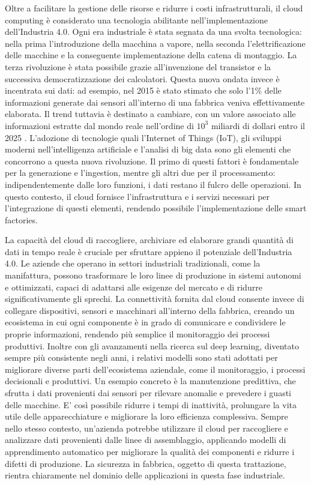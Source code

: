 Oltre a facilitare la gestione delle risorse e ridurre i costi infrastrutturali, il cloud computing è considerato una tecnologia abilitante nell'implementazione dell’Industria 4.0. Ogni era industriale è stata segnata da una svolta tecnologica: nella prima l'introduzione della macchina a vapore, nella seconda l'elettrificazione delle macchine e la conseguente implementazione della catena di montaggio. La terza rivoluzione è stata possibile grazie all'invenzione del transistor e la successiva democratizzazione dei calcolatori. Questa nuova ondata invece è incentrata sui dati: ad esempio, nel 2015 è stato stimato che solo l'1\% delle informazioni generate dai sensori all'interno di una fabbrica veniva effettivamente elaborata. Il trend tuttavia è destinato a cambiare, con un valore associato alle informazioni estratte dal mondo reale nell'ordine di $10^3$ miliardi di dollari entro il 2025 \cite{b6mckinsey}.  L’adozione di tecnologie quali l’Internet of Things (IoT), gli sviluppi moderni nell'intelligenza artificiale e l’analisi di big data sono gli elementi che concorrono a questa nuova rivoluzione. Il primo di questi fattori è fondamentale per la generazione e l'ingestion, mentre gli altri due per il processamento: indipendentemente dalle loro funzioni, i dati restano il fulcro delle operazioni. In questo contesto, il cloud fornisce l'infrastruttura e i servizi necessari per l'integrazione di questi elementi, rendendo possibile l'implementazione delle smart factories. 

La capacità del cloud di raccogliere, archiviare ed elaborare grandi quantità di dati in tempo reale è cruciale per sfruttare appieno il potenziale dell’Industria 4.0. Le aziende che operano in settori industriali tradizionali, come la manifattura, possono trasformare le loro linee di produzione in sistemi autonomi e ottimizzati, capaci di adattarsi alle esigenze del mercato e di ridurre significativamente gli sprechi. La connettività fornita dal cloud consente invece di collegare dispositivi, sensori e macchinari all'interno della fabbrica, creando un ecosistema in cui ogni componente è in grado di comunicare e condividere le proprie informazioni, rendendo più semplice il monitoraggio dei processi produttivi. Inoltre con gli avanzamenti nella ricerca sul deep learning, diventato sempre più consistente negli anni, i relativi modelli sono stati adottati per migliorare diverse parti dell'ecosistema aziendale, come il monitoraggio, i processi decisionali e produttivi. Un esempio concreto è la manutenzione predittiva, che sfrutta i dati provenienti dai sensori per rilevare anomalie e prevedere i guasti delle macchine. E' così possibile ridurre i tempi di inattività, prolungare la vita utile delle apparecchiature e migliorare la loro efficienza complessiva. Sempre nello stesso contesto, un'azienda potrebbe utilizzare il cloud per raccogliere e analizzare dati provenienti dalle linee di assemblaggio, applicando modelli di apprendimento automatico per migliorare la qualità dei componenti e ridurre i difetti di produzione. La sicurezza in fabbrica, oggetto di questa trattazione, rientra chiaramente nel dominio delle applicazioni in questa fase industriale. 

